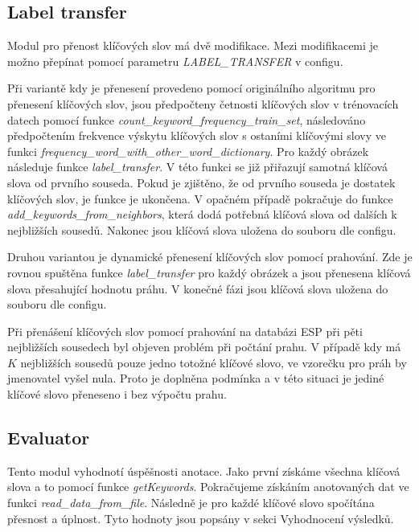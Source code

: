 \documentclass[czech,BP]{thesiskiv}
\begin{document}
\subsection{Label transfer}
\par Modul pro přenost klíčových slov má dvě modifikace. Mezi modifikacemi je možno přepínat pomocí parametru \textit{LABEL\_TRANSFER} v configu. 

\par Při variantě kdy je přenesení provedeno pomocí originálního algoritmu pro přenesení klíčových slov, jsou předpočteny četnosti klíčových slov v trénovacích datech pomocí funkce \textit{count\_keyword\_frequency\_train\_set}, následováno předpočtením frekvence výskytu klíčových slov s ostaními klíčovými slovy ve funkci \textit{frequency\_word\_with\_other\_word\_dictionary}. Pro každý obrázek následuje funkce \textit{label\_transfer}. V této funkci se již přiřazují samotná klíčová slova od prvního souseda. Pokud je zjištěno, že od prvního souseda je dostatek klíčových slov, je funkce je ukončena. V opačném případě pokračuje do funkce \textit{add\_keywords\_from\_neighbors}, která dodá potřebná klíčová slova od dalších k nejbližších sousedů. Nakonec jsou klíčová slova uložena do souboru dle configu.

\par Druhou variantou je dynamické přenesení klíčových slov pomocí prahování. Zde je rovnou spuštěna funkce \textit{label\_transfer} pro každý obrázek a jsou přenesena klíčová slova přesahující hodnotu práhu. V konečné fázi jsou klíčová slova uložena do souboru dle configu. 

\par Při přenášení klíčových slov pomocí prahování na databázi ESP při pěti nejbližších sousedech byl objeven problém při počtání prahu. V případě kdy má $K$ nejbližších sousedů pouze jedno totožné klíčové slovo, ve vzorečku pro práh by jmenovatel vyšel nula. Proto je doplněna podmínka a v této situaci je jediné klíčové slovo přeneseno i bez výpočtu prahu. 
  

\subsection{Evaluator}
\par Tento modul vyhodnotí úspěšnosti anotace. Jako první získáme všechna klíčová slova a to pomocí funkce \textit{getKeywords}. Pokračujeme získáním anotovaných dat ve funkci \textit{read\_data\_from\_file}.  Následně je pro každé klíčové slovo spočítána přesnost a úplnost. Tyto hodnoty jsou popsány v sekci Vyhodnocení výsledků.
\end{document}
